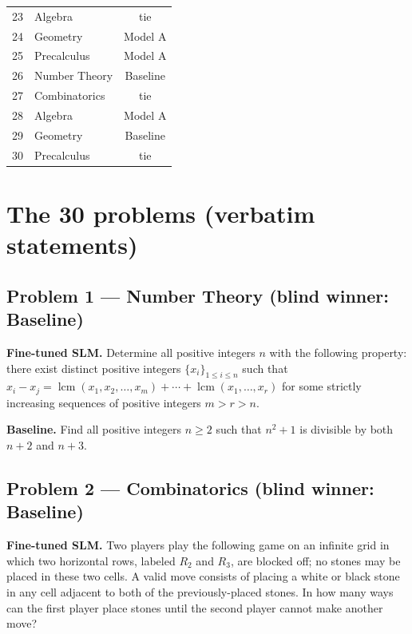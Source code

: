 \documentclass[11pt]{article}
\begin{document}
\begin{tabular}{clc}
23 & Algebra & tie \\

24 & Geometry & Model A \\

25 & Precalculus & Model A \\

26 & Number Theory & Baseline \\

27 & Combinatorics & tie \\

28 & Algebra & Model A \\

29 & Geometry & Baseline \\

30 & Precalculus & tie \\

\end{tabular}

\section*{The 30 problems (verbatim statements)}

\subsection*{Problem 1 --- Number Theory \quad (blind winner: Baseline)}

\textbf{Fine-tuned SLM.} Determine all positive integers $n$ with the following property: there exist distinct positive integers $\{ x_{i} \}_{1 \leq i \leq n}$ such that $x_{i}-x_{j}=\operatorname{lcm}(x_{1},x_{2}, \ldots, x_{m})+\cdots+\operatorname{lcm}(x_{1}, \ldots, x_{r})$ for some strictly increasing sequences of positive integers $m>r>n$.

\medskip

\textbf{Baseline.} Find all positive integers $n \geq 2$ such that $n^2 + 1$ is divisible by both $n+2$ and $n+3$.

\subsection*{Problem 2 --- Combinatorics \quad (blind winner: Baseline)}

\textbf{Fine-tuned SLM.} Two players play the following game on an infinite grid in which two horizontal rows, labeled $R_{2}$ and $R_{3}$, are blocked off; no stones may be placed in these two cells. A valid move consists of placing a white or black stone in any cell adjacent to both of the previously-placed stones. In how many ways can the first player place stones until the second player cannot make another move?
\end{document}
